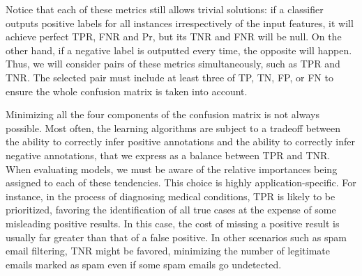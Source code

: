 Notice that each of these metrics still allows trivial solutions: if a classifier outputs positive labels for all instances irrespectively of the input features, it will achieve perfect TPR, FNR and Pr, but its TNR and FNR will be null. On the other hand, if a negative label is outputted every time, the opposite will happen.
Thus, we will consider pairs of these metrics simultaneously, such as TPR and TNR.
The selected pair must include at least three of TP, TN, FP, or FN to ensure the whole confusion matrix is taken into account.

Minimizing all the four components of the confusion matrix is not always possible.
%
Most often, the learning algorithms are subject to a tradeoff between the ability to correctly infer positive annotations and the ability to correctly infer negative annotations, that we express as a balance between TPR and TNR. When evaluating models, we must be aware of the relative importances being assigned to each of these tendencies.
%
%
%
%
This choice is highly application-specific. For instance, in the process of diagnosing medical conditions, TPR is likely to be prioritized, favoring the identification of all true cases at the expense of some misleading positive results.
In this case, the cost of missing a positive result is usually far greater than that of a false positive. In other scenarios such as spam email filtering, TNR might be favored, minimizing the number of legitimate emails marked as spam even if some spam emails go undetected.

